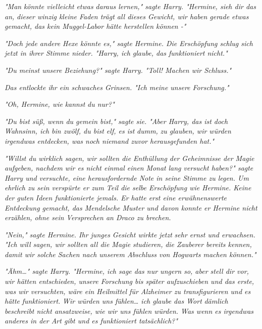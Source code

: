 {\emph{"Man} \emph{könnte vielleicht} \emph{\emph{etwas}} \emph{daraus lernen," sagte Harry. "Hermine, sieh dir das} \emph{\emph{an,}} \emph{dieser winzig kleine Faden trägt all dieses Gewicht, wir haben gerade etwas gemacht, das kein Muggel-Labor hätte herstellen können -"}

\emph{"Doch jede andere Hexe könnte es," sagte Hermine. Die Erschöpfung schlug sich jetzt in ihrer Stimme nieder. "Harry, ich glaube, das funktioniert nicht."}

\emph{"Du meinst unsere Beziehung?" sagte Harry. "Toll! Machen wir Schluss."}

\emph{Das entlockte ihr ein schwaches Grinsen. "Ich meine unsere Forschung."}

\emph{"Oh, Hermine, wie} \emph{\emph{kannst}} \emph{du nur?"}

\emph{"Du bist süß, wenn du gemein bist," sagte sie. "Aber Harry, das ist doch Wahnsinn, ich bin zwölf, du bist elf, es ist} \emph{\emph{dumm,}} \emph{zu glauben, wir würden irgendwas entdecken, was noch niemand zuvor herausgefunden hat."}

\emph{"Willst du wirklich sagen, wir sollten die Enthüllung der Geheimnisse der Magie aufgeben, nachdem wir es nicht einmal einen} \emph{\emph{Monat}} \emph{lang versucht haben?" sagte Harry und versuchte, eine herausfordernde Note in seine Stimme zu legen. Um ehrlich zu sein verspürte er zum Teil die selbe Erschöpfung wie Hermine. Keine der} \emph{\emph{guten}} \emph{Ideen funktionierte jemals. Er hatte erst eine erwähnenswerte Entdeckung gemacht, das Mendelsche Muster und davon konnte er Hermine nicht erzählen, ohne sein Versprechen an Draco zu brechen.}

\emph{"Nein," sagte Hermine. Ihr junges Gesicht wirkte} \emph{jetzt} \emph{sehr ernst und erwachsen. "Ich will sagen, wir sollten all die Magie} \emph{\emph{studieren,}} \emph{die Zauberer bereits kennen, damit wir solche Sachen nach unserem Abschluss von Hogwarts machen können."}

\emph{"Ähm…" sagte Harry. "Hermine, ich sage das nur ungern so, aber stell dir vor, wir hätten entschieden, unsere Forschung bis später aufzuschieben und das erste, was wir versuchten, wäre ein Heilmittel für Alzheimer zu transfigurieren und es hätte} \emph{\emph{funktioniert.}} \emph{Wir würden uns fühlen… ich glaube das Wort} \emph{\emph{dämlich}} \emph{beschreibt nicht ansatzweise, wie wir uns fühlen würden. Was wenn es irgendwas anderes in der Art gibt und es funktioniert tatsächlich?"}

}
